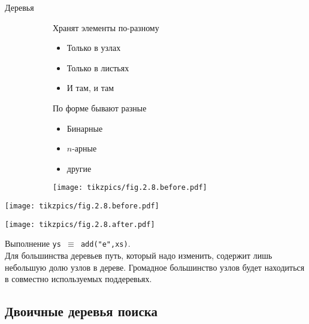 \begin{frame}{Деревья}
\begin{figure}[ht]
\begin{subfigure}{.49\textwidth}
Хранят элементы по-разному
\begin{itemize}
\item Только в узлах
\item Только в листьях
\item И там, и там
\end{itemize}
\vspace{1em}
По форме бывают разные
\begin{itemize}
\item Бинарные
\item $n$-арные
\item другие
\end{itemize}
\end{subfigure}
\begin{subfigure}{.49\textwidth}
\texttt{[image: tikzpics/fig.2.8.before.pdf]}\par
\end{subfigure}
\end{figure}
\end{frame}


\begin{frame}
\begin{minipage}{\textwidth}
\begin{minipage}[t]{.48\textwidth}\vspace{0em}
  \texttt{[image: tikzpics/fig.2.8.before.pdf]}\par
\end{minipage}
\begin{minipage}[t]{.48\textwidth}\vspace{0em}
  \texttt{[image: tikzpics/fig.2.8.after.pdf]}\par
\end{minipage}
\end{minipage}
Выполнение \texttt{ys $\equiv$ add("e",xs)}.\\

Для большинства деревьев путь, который надо изменить, содержит лишь небольшую долю узлов в дереве. Громадное
большинство узлов будет находиться в совместно используемых поддеревьях.
\end{frame}

\subsection{Двоичные деревья поиска}


